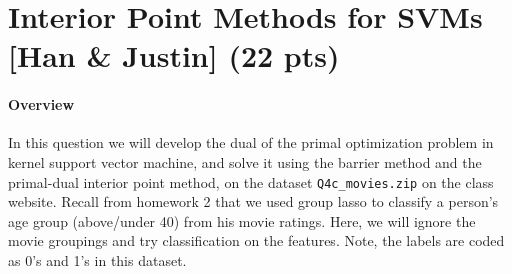 \documentclass{article}
\theoremstyle{remark}
\theoremstyle{definition}
\begin{document}
\section{Interior Point Methods for SVMs [Han \& Justin] (22 pts)}

\paragraph{Overview} In this question we will develop the dual of the primal
optimization problem in kernel support vector machine, and solve it using the
barrier method and the primal-dual interior point method, on the dataset
\texttt{Q4c\_movies.zip} on the class website. Recall from homework 2 that we
used group lasso to classify a person’s age group (above/under 40) from his
movie ratings. Here, we will ignore the movie groupings and try classification
on the features. Note, the labels are coded as 0's and 1's in this dataset.
\end{document}
